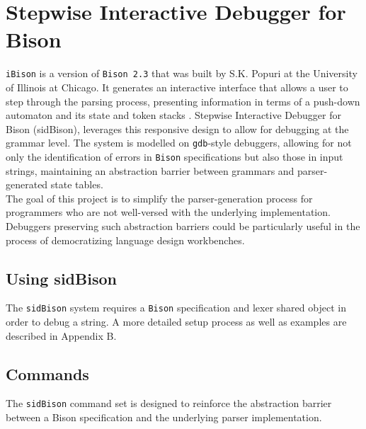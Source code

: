 \chapter{Stepwise Interactive Debugger for Bison}


\verb|iBison| is a version of \verb|Bison 2.3| that was built by S.K. Popuri at the University of Illinois at Chicago. It generates 
an interactive interface that allows a user to step through the parsing process, presenting information in terms of a push-down automaton and its state and token stacks \cite{iBison}. Stepwise Interactive Debugger for Bison (sidBison), leverages this responsive design to allow for debugging at the grammar level. The system is modelled on \verb|gdb|-style debuggers, allowing for not only the identification of errors in \verb|Bison| specifications but also those in input strings, maintaining an abstraction barrier between grammars and parser-generated state tables.\\

The goal of this project is to simplify the parser-generation process for programmers who are not well-versed with the underlying implementation. Debuggers preserving such abstraction barriers could be particularly useful in the process of democratizing language design workbenches.

\section{Using sidBison}

The \verb|sidBison| system requires a \verb|Bison| specification and lexer shared object in order to debug a string. A more detailed setup process as well as examples are described in Appendix B.

\section{Commands}

The \verb|sidBison| command set is designed to reinforce the abstraction barrier between a Bison specification and the underlying parser implementation.

